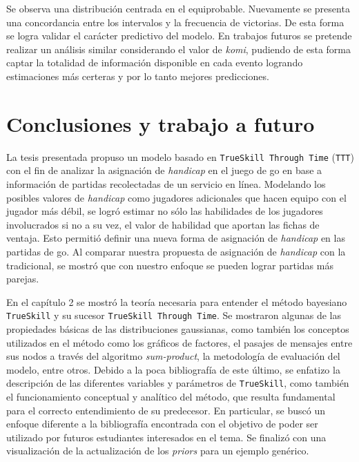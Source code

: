 \documentclass[11pt,twoside,spanish]{report} %
\begin{document}
Se observa una distribuci\'on centrada en el equiprobable.
Nuevamente se presenta una concordancia entre los intervalos y la frecuencia de victorias.
De esta forma se logra validar el car\'acter predictivo del modelo.
En trabajos futuros se pretende realizar un an\'alisis similar considerando el valor de \textit{komi}, pudiendo de esta forma captar la totalidad de informaci\'on disponible en cada evento logrando estimaciones m\'as certeras y por lo tanto mejores predicciones.


\chapter{Conclusiones y trabajo a futuro}

La tesis presentada propuso un modelo basado en \texttt{TrueSkill Through Time} (\texttt{TTT}) con el fin de analizar la asignaci\'on de \textit{handicap} en el juego de go en base a informaci\'on de partidas recolectadas de un servicio en l\'inea.
Modelando los posibles valores  de \textit{handicap} como jugadores adicionales que hacen equipo con el jugador m\'as d\'ebil, se logr\'o estimar no s\'olo las habilidades de los jugadores involucrados si no a su vez, el valor de habilidad que aportan las fichas de ventaja. 
Esto permiti\'o definir una nueva forma de asignaci\'on de \textit{handicap} en las partidas de go.
Al comparar nuestra propuesta de asignaci\'on de \textit{handicap} con la tradicional, se mostr\'o que con nuestro enfoque se pueden lograr partidas m\'as parejas. 

En el cap\'itulo 2 se mostr\'o la teor\'ia necesaria para entender el m\'etodo bayesiano  \texttt{TrueSkill} y su sucesor \texttt{TrueSkill Through Time}.
Se mostraron algunas de las propiedades b\'asicas de las distribuciones gaussianas, como tambi\'en los conceptos utilizados en el m\'etodo como los gr\'aficos de factores, el pasajes de mensajes entre sus nodos a trav\'es del algoritmo \textit{sum-product}, la metodolog\'ia de evaluaci\'on del modelo, entre otros.
Debido a la poca bibliograf\'ia de este \'ultimo, se enfatizo la descripci\'on de las diferentes variables y par\'ametros de \texttt{TrueSkill}, como tambi\'en el funcionamiento conceptual y anal\'itico del m\'etodo, que resulta fundamental para el correcto entendimiento de su predecesor.
En particular, se busc\'o un enfoque diferente a la bibliograf\'ia encontrada con el objetivo de poder ser utilizado por futuros estudiantes interesados en el tema.
Se finaliz\'o con una visualizaci\'on de la actualizaci\'on de los \textit{priors} para un ejemplo gen\'erico. 
\end{document}
